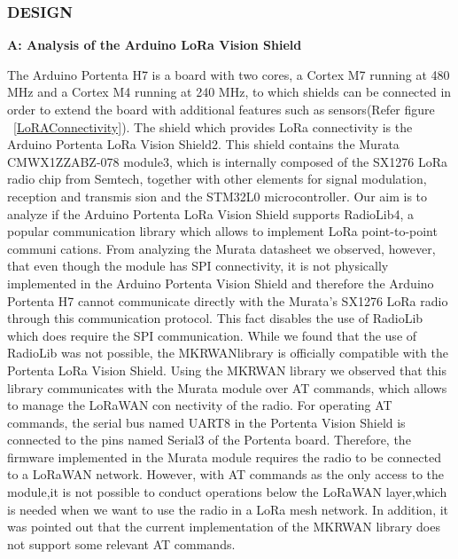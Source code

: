 \subsubsection{DESIGN}

\textbf{A: Analysis of the Arduino LoRa Vision Shield}\newline

The Arduino Portenta H7 is a board with two cores, a
Cortex M7 running at 480 MHz and a Cortex M4 running
at 240 MHz, to which shields can be connected in order
to extend the board with additional features such as sensors(Refer figure ~\ref{LoRAConnectivity}).
The shield which provides LoRa connectivity is the Arduino
Portenta LoRa Vision Shield2. This shield contains the Murata
CMWX1ZZABZ-078 module3, which is internally composed
of the SX1276 LoRa radio chip from Semtech, together with
other elements for signal modulation, reception and transmis
sion and the STM32L0 microcontroller. \cite{PortentaLANMAN2022}
\newline
Our aim is to analyze if the Arduino Portenta LoRa Vision
Shield supports RadioLib4, a popular communication library
which allows to implement LoRa point-to-point communi
cations. From analyzing the Murata datasheet we observed,
however, that even though the module has SPI connectivity,
it is not physically implemented in the Arduino Portenta
Vision Shield and therefore the Arduino Portenta H7 cannot
communicate directly with the Murata’s SX1276 LoRa radio
through this communication protocol. This fact disables the
use of RadioLib which does require the SPI communication.
While we found that the use of RadioLib was not possible,
the MKRWANlibrary is officially compatible with the Portenta
LoRa Vision Shield. Using the MKRWAN library we observed
that this library communicates with the Murata module over
AT commands, which allows to manage the LoRaWAN con
nectivity of the radio. For operating AT commands, the serial
bus named UART8 in the Portenta Vision Shield is connected
to the pins named Serial3 of the Portenta board. Therefore, the
firmware implemented in the Murata module requires the radio
to be connected to a LoRaWAN network. However, with AT
commands as the only access to the module,it is not possible to
conduct operations below the LoRaWAN layer,which is needed
when we want to use the radio in a LoRa mesh network. In
addition, it was pointed out that the current implementation
of the MKRWAN library does not support some relevant AT
commands. \cite{PortentaLANMAN2022} \newline

